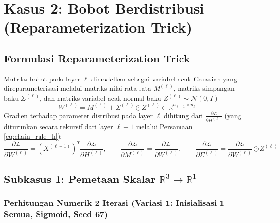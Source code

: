 \documentclass[11pt,a4paper]{article}
\theoremstyle{plain}
\theoremstyle{definition}
\theoremstyle{remark}
\begin{document}
\clearpage
\section{Kasus 2: Bobot Berdistribusi (Reparameterization Trick)}
\label{sec:bobot_distribusi}

\subsection{Formulasi Reparameterization Trick}
\label{subsec:reparam_formula}

\noindent Matriks bobot pada layer $\ell$ dimodelkan sebagai variabel acak Gaussian yang direparameterisasi melalui matriks nilai rata-rata $M^{(\ell)}$, matriks simpangan baku $\Sigma^{(\ell)}$, dan matriks variabel acak normal baku $Z^{(\ell)} \sim \mathcal{N}(0, I)$:
\begin{equation}
    W^{(\ell)} = M^{(\ell)} + \Sigma^{(\ell)} \odot Z^{(\ell)} \in \mathbb{R}^{n_{\ell-1} \times n_\ell} \label{eq:reparam_matrix}
\end{equation}
Gradien terhadap parameter distribusi pada layer $\ell$ dihitung dari $\frac{\partial \mathcal{L}}{\partial H^{(\ell)}}$ (yang diturunkan secara rekursif dari layer $\ell+1$ melalui Persamaan \eqref{eq:chain_rule_h}):
\begin{equation}
    \frac{\partial \mathcal{L}}{\partial W^{(\ell)}} = \left(X^{(\ell-1)}\right)^T \frac{\partial \mathcal{L}}{\partial H^{(\ell)}}, \qquad
    \frac{\partial \mathcal{L}}{\partial M^{(\ell)}} = \frac{\partial \mathcal{L}}{\partial W^{(\ell)}}, \qquad
    \frac{\partial \mathcal{L}}{\partial \Sigma^{(\ell)}} = \frac{\partial \mathcal{L}}{\partial W^{(\ell)}} \odot Z^{(\ell)} \label{eq:reparam_gradients}
\end{equation}

\subsection{Subkasus 1: Pemetaan Skalar \texorpdfstring{$\mathbb{R}^3 \to \mathbb{R}^1$}{R3 -> R1}}
\label{subsec:distribusi_r3_r1}

\subsubsection{Perhitungan Numerik 2 Iterasi (Variasi 1: Inisialisasi 1 Semua, Sigmoid, Seed 67)}
\label{subsubsec:distribusi_r1_hitung2iterasi}
\end{document}
